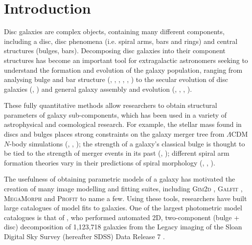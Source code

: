 \documentclass[trackchanges]{aastex63}
\begin{document}
\section{Introduction}
\label{sec:introduction}

Disc galaxies are complex objects, containing many different components, including a disc, disc phenomena (i.e. spiral arms, bars and rings) and central structures (bulges, bars). Decomposing disc galaxies into their component structures has become an important tool for extragalactic astronomers seeking to understand the formation and evolution of the galaxy population, ranging from analysing bulge and bar structure (\citealt{1985ApJ...288..438E}, \citealt{1996A&AS..118..557D}, \citealt{2011MNRAS.415.3308G}, \citealt{Mendez-Abreu2016:1610.05324v1}, \citealt{Gao2017:1709.00746v1}, \citealt{2018MNRAS.473.4731K}) to the secular evolution of disc galaxies (\citealt{1998ApJ...500...75L}, \citealt{2005ApJ...635..959B}) and general galaxy assembly and evolution (\citealt{Simard2002:astro-ph/0205025v2}, \citealt{megamorph-paper}, \citealt{2012MNRAS.421.2277L}, \citealt{2019arXiv191002664R}).

These fully quantitative methods allow researchers to obtain structural parameters of galaxy sub-components, which has been used in a variety of astrophysical and cosmological research. For example, the stellar mass found in discs and bulges places strong constraints on the galaxy merger tree from $\Lambda$CDM $N$-body simulations (\citealt{2009MNRAS.396.1972P}, \citealt{Hopkins2010:1004.2708v3}, \citealt{2018MNRAS.475.5133R}); the strength of a galaxy's classical bulge is thought to be tied to the strength of merger events in its past (\citealt{2005ApJ...622L...9S}, \citealt{Kormendy2010:1009.3015v1}); different spiral arm formation theories vary in their predictions of spiral morphology (\citealt{Dobbs2014:1407.5062v1}, \citealt{Pour-Imani2016:1608.00969v1}, \citealt{2017MNRAS.472.2263H}).

The usefulness of obtaining parametric models of a galaxy has motivated the creation of many image modelling and fitting suites, including \textsc{Gim2d} \citep{gim2d-paper}, \textsc{Galfit} \citep{galfit-paper}, \textsc{MegaMorph} \citep{megamorph-paper} and \textsc{Profit} \citep{profit-paper} to name a few. Using these tools, researchers have built large catalogues of model fits to galaxies. One of the largest photometric model catalogues is that of \citet{2011ApJS..196...11S}, who performed automated 2D, two-component (bulge + disc) decomposition of 1,123,718 galaxies from the Legacy imaging of the Sloan Digital Sky Survey (hereafter SDSS) Data Release 7 \citep{SDSSDR7}.
\end{document}
